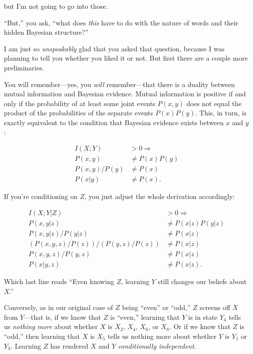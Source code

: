 {{{
 but I'm not going to go into those. }

{
 ``But,'' you ask,
``what does \textit{this} have to do with the nature
of words and their hidden Bayesian structure?''}

{
 I am just so \textit{unspeakably} glad that you asked that
question, because I was planning to tell you whether you liked it or
not. But first there are a couple more preliminaries.}

{
 You will remember---yes, you \textit{will} remember---that there
is a duality between mutual information and Bayesian evidence. Mutual
information is positive if and only if the probability of at least some
joint events $P(x,y)$ does not equal the product of the probabilities of
the separate events $P(x)P(y)$. This, in turn, is exactly equivalent to
the condition that Bayesian evidence exists between $x$ and $y$:}

\begin{align*}
 I(X;Y) &> 0 \Rightarrow \\
 P(x,y) &\neq P(x)P(y) \\
 P(x,y) / P(y) &\neq P(x) \\
 P(x|y) &\neq P(x).
\end{align*}


{
 If you're conditioning on $Z$, you just adjust the
whole derivation accordingly:}

\begin{align*}
 I(X;Y|Z) &> 0 \Rightarrow \\
 P(x,y|z) &\neq P(x|z)P(y|z) \\
 P(x,y|z) / P(y|z) &\neq P (x|z) \\
 (P(x,y,z)/P(z)) / (P(y,z)/P(z)) &\neq P(x|z) \\
 P(x,y,z) / P(y,z) &\neq P(x|z) \\
 P(x|y,z) &\neq P(x|z).
\end{align*}

{
 Which last line reads ``Even knowing $Z$, learning
$Y$ still changes our beliefs about $X$.''}

{
 Conversely, as in our original case of $Z$ being
``even'' or
``odd,'' $Z$ screens off $X$ from
$Y$---that is, if we know that $Z$ is
``even,'' learning that $Y$ is in
state $Y_{4}$ tells us \textit{nothing more} about whether $X$
is $X_{2}$, $X_{4}$, $X_{6}$, or
$X_{8}$. Or if we know that $Z$ is
``odd,'' then learning that $X$ is
$X_{5}$ tells us nothing more about whether $Y$ is
$Y_{1}$ or $Y_{3}$. Learning $Z$ has rendered $X$ and
$Y$ \textit{conditionally independent}.}

}}
